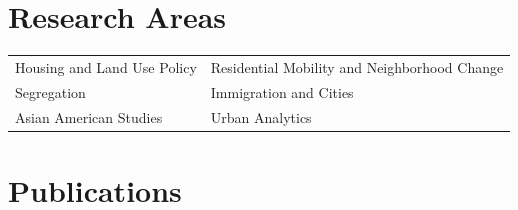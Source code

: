 \documentclass[11pt,letterpaper]{article}
\begin{document}
\section{Research Areas}
\begin{tabular}{@{}p{} p{}@{}}
Housing and Land Use Policy & Residential Mobility and Neighborhood Change\\
Segregation & Immigration and Cities\\
Asian American Studies & Urban Analytics
\end{tabular}

\section{Publications}

\end{document}
